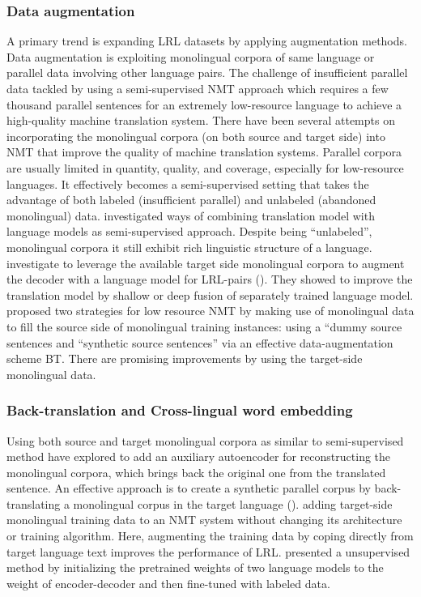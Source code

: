 \documentclass[manuscript,screen]{acmart}
\begin{document}
\subsubsection{\bf{Data augmentation}}
A primary trend is expanding LRL datasets by applying augmentation methods. Data augmentation is exploiting monolingual corpora of same language or parallel data involving other language pairs.
The challenge of insufficient parallel data tackled by using a semi-supervised NMT approach which requires a few thousand parallel sentences for an extremely low-resource language to achieve a high-quality machine translation system. There have been several attempts on incorporating the monolingual corpora (on both source and target side) into NMT that improve the quality of machine translation systems. Parallel corpora are usually limited in quantity, quality, and coverage, especially for low-resource languages. It effectively becomes a semi-supervised setting \citet{cheng2016semi,wang2019semi} that takes the advantage of both labeled (insufficient parallel) and unlabeled (abandoned monolingual) data. \citet{skorokhodov2018semi} investigated ways of combining translation model with language models as semi-supervised approach. Despite being ``unlabeled'', monolingual corpora it still exhibit rich linguistic structure of a language. \citet{gulcehre2015using} investigate to leverage the available target side monolingual corpora to augment the decoder with a language model for LRL-pairs (\citet{baziotis2020language}). They showed to improve the translation model by shallow or deep fusion of separately trained language model. \citet{sennrich2016improving} proposed two strategies for low resource NMT by making use of monolingual data to fill the source side of monolingual training instances: using a ``dummy source sentences and ``synthetic source sentences'' via an effective data-augmentation scheme BT. There are promising improvements by using the target-side monolingual data. 

\subsubsection{\bf{Back-translation and Cross-lingual word embedding}} Using both source and target monolingual corpora as similar to semi-supervised method \citet{cheng2016semi} have explored to add an auxiliary autoencoder for reconstructing the monolingual corpora, which brings back the original one from the translated sentence. An effective approach is to create a synthetic parallel corpus by back-translating a monolingual corpus in the target language (\citet{sennrich2016improving}).
\citet{currey2017copied} adding target-side monolingual training data to an NMT system without changing its architecture or training algorithm. Here, augmenting the training data by coping directly from target language text improves the performance of LRL. \citet{ramachandran2017unsupervised} presented a unsupervised method by initializing the pretrained weights of two language models to the weight of encoder-decoder and then fine-tuned with labeled data.
\end{document}

